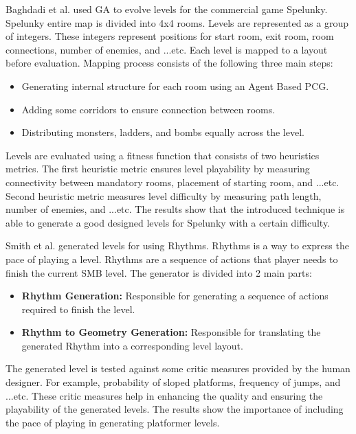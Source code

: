 Baghdadi et al.\cite{spelunkyLevelGeneration} used GA to evolve levels for the commercial game Spelunky\cite{spelunky}. Spelunky entire map is divided into 4x4 rooms. Levels are represented as a group of integers. These integers represent positions for start room, exit room, room connections, number of enemies, and ...etc. Each level is mapped to a layout before evaluation. Mapping process consists of the following three main steps:
\begin{itemize} \itemsep0pt \parskip0pt 
	\item Generating internal structure for each room using an Agent Based PCG.
	\item Adding some corridors to ensure connection between rooms.
	\item Distributing monsters, ladders, and bombs equally across the level.
\end{itemize}
Levels are evaluated using a fitness function that consists of two heuristics metrics. The first heuristic metric ensures level playability by measuring connectivity between mandatory rooms, placement of starting room, and ...etc. Second heuristic metric measures level difficulty by measuring path length, number of enemies, and ...etc. The results show that the introduced technique is able to generate a good designed levels for Spelunky with a certain difficulty.\\\par

Smith et al.\cite{rythmBasedGeneration} generated levels for  using Rhythms. Rhythms is a way to express the pace of playing a level. Rhythms are a sequence of actions that player needs to finish the current SMB level. The generator is divided into 2 main parts: 
\begin{itemize} \itemsep0pt \parskip0pt 
	\item \textbf{Rhythm Generation:} Responsible for generating a sequence of actions required to finish the level.
	\item \textbf{Rhythm to Geometry Generation:} Responsible for translating the generated Rhythm into a corresponding level layout.
\end{itemize}
The generated level is tested against some critic measures provided by the human designer. For example, probability of sloped platforms, frequency of jumps, and ...etc. These critic measures help in enhancing the quality and ensuring the playability of the generated levels. The results show the importance of including the pace of playing in generating platformer levels.\\\par

